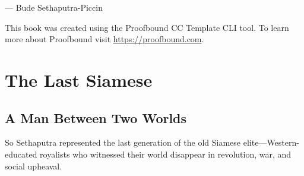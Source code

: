 \documentclass[
  Letterpaper,
]{scrbook}
\begin{document}
--- Bude Sethaputra-Piccin

\begin{tcolorbox}[enhanced jigsaw, toptitle=1mm, arc=.35mm, colbacktitle=quarto-callout-note-color!10!white, bottomrule=.15mm, toprule=.15mm, opacitybacktitle=0.6, colframe=quarto-callout-note-color-frame, left=2mm, colback=white, title=\textcolor{quarto-callout-note-color}{\faInfo}\hspace{0.5em}{About This Book}, coltitle=black, breakable, opacityback=0, bottomtitle=1mm, titlerule=0mm, rightrule=.15mm, leftrule=.75mm]

This book was created using the Proofbound CC Template CLI tool. To
learn more about Proofbound visit \url{https://proofbound.com}.

\end{tcolorbox}


\chapter{The Last Siamese}\label{sec-last-siamese}

\section{A Man Between Two Worlds}\label{a-man-between-two-worlds}

So Sethaputra represented the last generation of the old Siamese
elite---Western-educated royalists who witnessed their world disappear
in revolution, war, and social upheaval.
\end{document}
